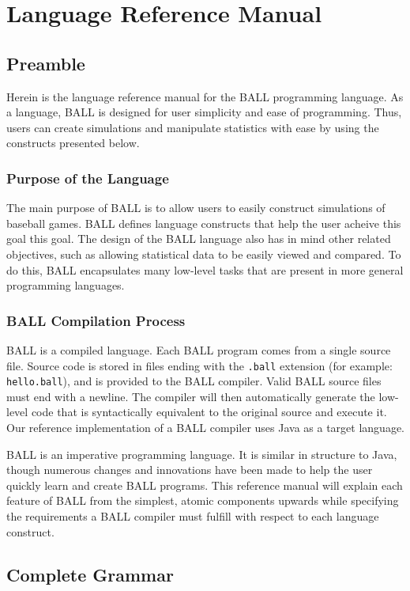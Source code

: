 
\chapter{Language Reference Manual}\label{refman}

\section{Preamble}
Herein is the language reference manual for the BALL programming
language. As a language, BALL is designed for user simplicity and ease
of programming. Thus, users can create simulations and manipulate
statistics with ease by using the constructs presented below.

\subsection{Purpose of the Language}
The main purpose of BALL is to allow users to easily construct
simulations of baseball games. BALL defines language constructs that
help the user acheive this goal this goal. The design of the BALL
language also has in mind other related objectives, such as allowing
statistical data to be easily viewed and compared. To do this, BALL
encapsulates many low-level tasks that are present in more general
programming languages.

\subsection{BALL Compilation Process}\label{ref_compile}
BALL is a compiled language. Each BALL program comes from a single
source file. Source code is stored in files ending with the
\texttt{.ball} extension (for example: \texttt{hello.ball}), and is
provided to the BALL compiler. Valid BALL source files must end with a
newline. The compiler will then automatically generate the low-level
code that is syntactically equivalent to the original source and
execute it. Our reference implementation of a BALL compiler uses Java
as a target language.

BALL is an imperative programming language. It is similar in structure
to Java, though numerous changes and innovations have been made to
help the user quickly learn and create BALL programs. This reference
manual will explain each feature of BALL from the simplest, atomic
components upwards while specifying the requirements a BALL compiler
must fulfill with respect to each language construct.



\pagebreak










\pagebreak

\section{Complete Grammar}\label{grammar}


